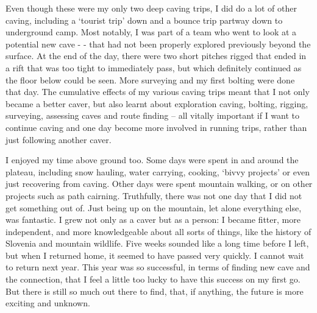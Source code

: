 
Even though these were my only two deep caving trips, I did do a lot of other caving, including a ‘tourist trip’ down  and a bounce trip partway down to underground camp. Most notably, I was part of a team who went to look at a potential new cave -  - that had not been properly explored previously beyond the surface. At the end of the day, there were two short pitches rigged that ended in a rift that was too tight to immediately pass, but which definitely continued as the floor below could be seen. More surveying and my first bolting were done that day. The cumulative effects of my various caving trips meant that I not only became a better caver, but also learnt about exploration caving, bolting, rigging, surveying, assessing caves and route finding – all vitally important if I want to continue caving and one day become more involved in running trips, rather than just following another caver.

I enjoyed my time above ground too. Some days were spent in and around the plateau, including snow hauling, water carrying, cooking, ‘bivvy projects’ or even just recovering from caving. Other days were spent mountain walking, or on other projects such as path cairning. Truthfully, there was not one day that I did not get something out of. Just being up on the mountain, let alone everything else, was fantastic. I grew not only as a caver but as a person: I became fitter, more independent, and more knowledgeable about all sorts of things, like the history of Slovenia and mountain wildlife. Five weeks sounded like a long time before I left, but when I returned home, it seemed to have passed very quickly. I cannot wait to return next year. This year was so successful, in terms of finding new cave and the connection, that I feel a little too lucky to have this success on my first go. But there is still so much out there to find, that, if anything, the future is more exciting and unknown.


